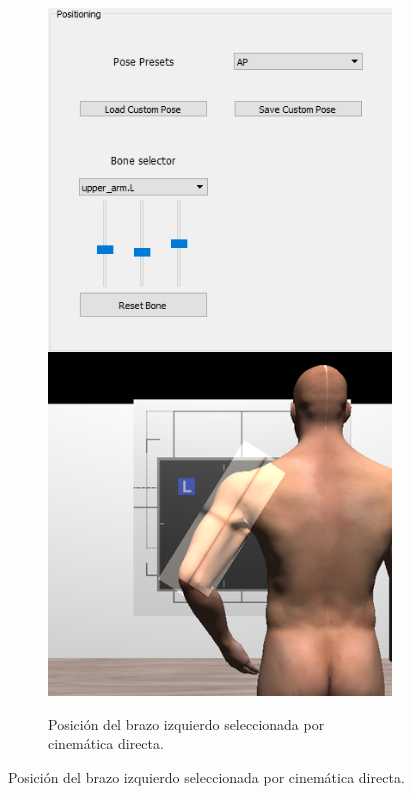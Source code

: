 \begin{figure}[ht]
    \begin{subfigure}[b]{0.32\linewidth}
        \centering
        {\includegraphics[width=\linewidth]{IMG/Pose1.png}}
        \caption{Posición del brazo izquierdo seleccionada por cinemática directa. \label{subfig:direct}}

\end{subfigure}
\end{figure}
